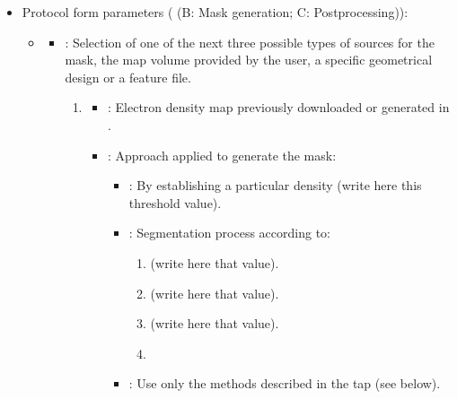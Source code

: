 \begin{itemize}
 \item Protocol form parameters ( (B: Mask generation; C: Postprocessing)):
  
    
    \begin{itemize}
        \item {}
            \begin{itemize}
                \item {}: Selection of one of the next three possible types of sources for the mask, the map volume provided by the user, a specific geometrical design or a feature file.
                \begin{enumerate}
                    \item {}
                            \begin{itemize}
                            \item {}: Electron density map previously downloaded or generated in \scipion.
                            \item {}: Approach applied to generate the mask:
                                \begin{itemize}
                                    \item {}: By establishing a particular density  (write here this threshold value).   
                                    \item {}: Segmentation process according to:
                                        \begin{enumerate}
                                            \item {}(write here that value).
                                            \item {}(write here that value).
                                            \item {}(write here that value).
                                            \item {}
                                       \end{enumerate}   
                                    \item {}: Use only the methods described in the tap  (see below).
                                \end{itemize}
                            \end{itemize}

\end{enumerate}
\end{itemize}
\end{itemize}
\end{itemize}
